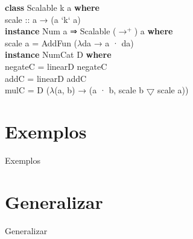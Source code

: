 \documentclass{beamer}
\begin{document}
\begin{frame}
    \textbf{class} Scalable k a \textbf{where}\\
        \hspace{1cm}scale :: a → (a ‘k‘ a)\\
    \vspace{2mm} 
    \textbf{instance} Num a ⇒ Scalable ($\to^+$) a \textbf{where}\\
        \hspace{1cm}scale a = AddFun ($\lambda$da → a · da)\\
    \vspace{5mm} 
    \textbf{instance} NumCat D \textbf{where}\\
        \hspace{1cm}negateC = linearD negateC\\
        \hspace{1cm}addC = linearD addC\\
        \hspace{1cm}mulC = D ($\lambda$(a, b) → (a · b, scale b $\bigtriangledown$ scale a))\\
\end{frame}


\section{Exemplos}
\begin{frame}{Exemplos}
\end{frame}

\section{Generalizar}
\begin{frame}{Generalizar}
\end{frame}
\end{document}
